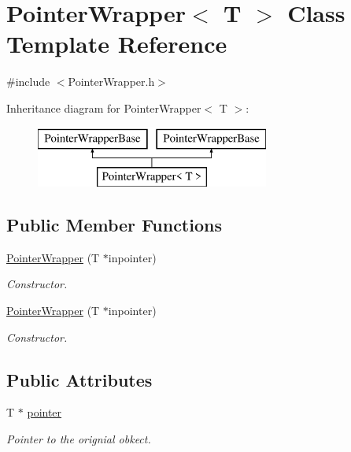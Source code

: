 \hypertarget{classPointerWrapper}{\section{Pointer\-Wrapper$<$ T $>$ Class Template Reference}
\label{classPointerWrapper}
}


{\ttfamily \#include $<$Pointer\-Wrapper.\-h$>$}

Inheritance diagram for Pointer\-Wrapper$<$ T $>$\-:\begin{figure}[H]
\begin{center}
\leavevmode
\includegraphics[height=2.000000cm]{classPointerWrapper}
\end{center}
\end{figure}
\subsection*{Public Member Functions}
\begin{DoxyCompactItemize}
\item 
\hyperlink{classPointerWrapper_aa645eb1963f91c9bddf5fd6ff578751b}{Pointer\-Wrapper} (T $\ast$inpointer)
\begin{DoxyCompactList}\small\item\em Constructor. \end{DoxyCompactList}\item 
\hyperlink{classPointerWrapper_aa645eb1963f91c9bddf5fd6ff578751b}{Pointer\-Wrapper} (T $\ast$inpointer)
\begin{DoxyCompactList}\small\item\em Constructor. \end{DoxyCompactList}\end{DoxyCompactItemize}
\subsection*{Public Attributes}
\begin{DoxyCompactItemize}
\item 
\hypertarget{classPointerWrapper_a29dd2322a9af40091b565a33d62afad4}{T $\ast$ \hyperlink{classPointerWrapper_a29dd2322a9af40091b565a33d62afad4}{pointer}}\label{classPointerWrapper_a29dd2322a9af40091b565a33d62afad4}

\begin{DoxyCompactList}\small\item\em Pointer to the orignial obkect. \end{DoxyCompactList}\end{DoxyCompactItemize}


